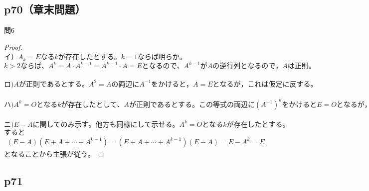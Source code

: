 \documentclass[dvipdfmx,uplatex,11pt]{jsarticle}
\begin{document}
\subsection{p70（章末問題）}
問6\\
\noindent
\begin{leftbar}
\begin{proof}
~\\
イ）$A_k=Eなるkが存在したとする。k = 1 ならば明らか。$\\
$k>2ならば、A^k=A·A^{k-1}=A^{k-1}· A = E となるので、A^{k-1}がAの逆行列となるので，Aは正則。$\\
\\
$ロ)Aが正則であるとする。A^2=Aの両辺にA^{-1}をかけると，A=Eとなるが，これは仮定に反する。$\\
\\
$ハ)A^k=Oとなる k が存在したとして、A が正則であるとする。この等式の両辺に (A^{−1})^kをかけるとE=Oとなるが，これは明らかに矛盾。$\\
\\
$ニ)E−A に関してのみ示す。他方も同様にして示せる。A^{k}=Oとなるkが存在したとする。$\\
$すると$
\begin{eqnarray*}
(E − A)(E+A+ \cdots +A^{k−1})=(E+A+ \cdots + A^{k−1})(E−A)=E−A^k=E
\end{eqnarray*}
$となることから主張が従う。$
\end{proof}
\end{leftbar}
%
%
%
\newpage
%
%
%
\setcounter{equation}{0}
\subsection{p71}
%
%
%
\end{document}
